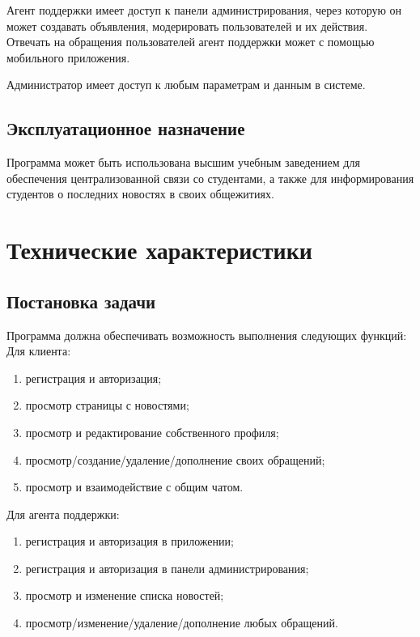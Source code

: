 \documentclass{../includes/TechDoc}
\begin{document}
    Агент поддержки имеет доступ к панели администрирования, через которую он может создавать объявления, модерировать пользователей и их действия.
    Отвечать на обращения пользователей агент поддержки может с помощью мобильного приложения.

    Администратор имеет доступ к любым параметрам и данным в системе.

    \subsection{Эксплуатационное назначение}

    Программа может быть использована высшим учебным заведением для обеспечения централизованной связи со студентами, а
    также для информирования студентов о последних новостях в своих общежитиях.


    \section{Технические характеристики}

    \subsection{Постановка задачи}

    Программа должна обеспечивать возможность выполнения следующих функций:\\

    Для клиента:
    \begin{enumerate}[noitemsep]
        \item регистрация и авторизация;
        \item просмотр страницы с новостями;
        \item просмотр и редактирование собственного профиля;
        \item просмотр/создание/удаление/дополнение своих обращений;
        \item просмотр и взаимодействие с общим чатом.
    \end{enumerate}

    Для агента поддержки:
    \begin{enumerate}[noitemsep]
        \item регистрация и авторизация в приложении;
        \item регистрация и авторизация в панели администрирования;
        \item просмотр и изменение списка новостей;
        \item просмотр/изменение/удаление/дополнение любых обращений.
    \end{enumerate}
\end{document}
